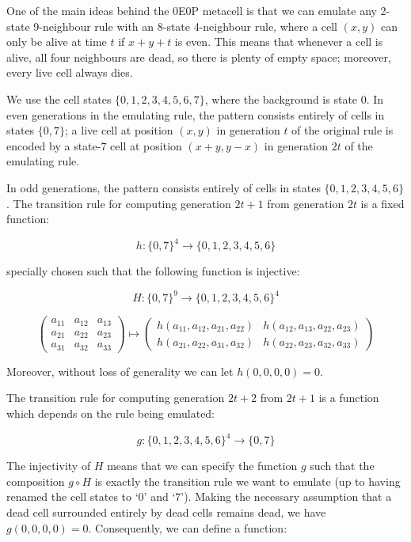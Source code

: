 One of the main ideas behind the 0E0P metacell is that we can emulate any
2-state 9-neighbour rule with an 8-state 4-neighbour rule, where a cell
$(x, y)$ can only be alive at time $t$ if $x + y + t$ is even. This means
that whenever a cell is alive, all four neighbours are dead, so there is
plenty of empty space; moreover, every live cell always dies.

We use the cell states $\{ 0, 1, 2, 3, 4, 5, 6, 7 \}$, where the background
is state 0. In even generations in the emulating rule, the pattern consists
entirely of cells in states $\{ 0, 7 \}$; a live cell at position $(x, y)$
in generation $t$ of the original rule is encoded by a state-$7$ cell at
position $(x + y, y - x)$ in generation $2t$ of the emulating rule.

In odd generations, the pattern consists entirely of cells in states
$\{ 0, 1, 2, 3, 4, 5, 6 \}$. The transition rule for computing generation
$2t + 1$ from generation $2t$ is a fixed function:

$$ h : \{ 0, 7 \}^4 \rightarrow \{ 0, 1, 2, 3, 4, 5, 6 \} $$

specially chosen such that the following function is injective:

$$ H : \{ 0, 7 \}^9 \rightarrow \{ 0, 1, 2, 3, 4, 5, 6 \}^4 $$


$$ \begin{pmatrix}
a_{11} & a_{12} & a_{13} \\
a_{21} & a_{22} & a_{23} \\
a_{31} & a_{32} & a_{33}
\end{pmatrix} \mapsto \begin{pmatrix}
h(a_{11}, a_{12}, a_{21}, a_{22}) & h(a_{12}, a_{13}, a_{22}, a_{23}) \\
h(a_{21}, a_{22}, a_{31}, a_{32}) & h(a_{22}, a_{23}, a_{32}, a_{33})
\end{pmatrix} $$

Moreover, without loss of generality we can let $h(0, 0, 0, 0) = 0$.

The transition rule for computing generation $2t + 2$ from $2t + 1$ is a
function which depends on the rule being emulated:

$$ g : \{ 0, 1, 2, 3, 4, 5, 6 \}^4 \rightarrow \{ 0, 7 \} $$

The injectivity of $H$ means that we can specify the function $g$
such that the composition $g \circ H$ is exactly the transition rule
we want to emulate (up to having renamed the cell states to `0' and `7').
Making the necessary assumption that a dead cell surrounded entirely by
dead cells remains dead, we have $g(0, 0, 0, 0) = 0$. Consequently, we
can define a function:

